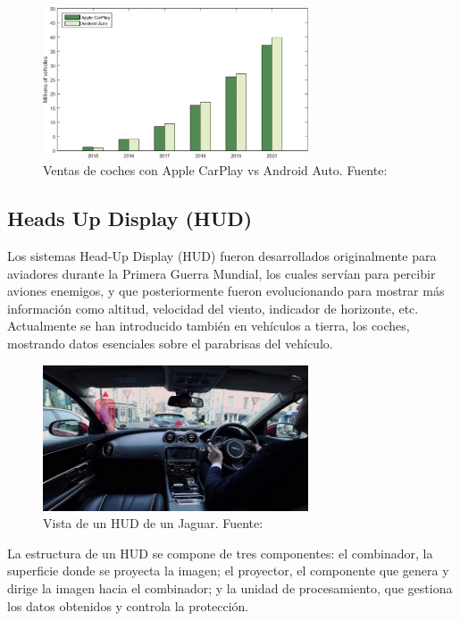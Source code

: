 \documentclass[12pt]{report} %
\begin{document}
\begin{figure}[H]
    \centering
    \includegraphics[width=0.7\textwidth]{integrationSolution.png}
	\caption{Ventas de coches con Apple CarPlay vs Android Auto. Fuente: \cite{mobileIntegration}}
	\label{fig:imagen6}
\end{figure}

\subsection{Heads Up Display (HUD)}

Los sistemas Head-Up Display (HUD) fueron desarrollados originalmente para aviadores durante la Primera Guerra Mundial, los cuales servían para percibir aviones enemigos, y que posteriormente fueron evolucionando para mostrar más información como altitud, velocidad del viento, indicador de horizonte, etc. Actualmente se han introducido también en vehículos a tierra, los coches, mostrando datos esenciales sobre el parabrisas del vehículo.
\cite{hudPaper}

\begin{figure}[h]
    \centering
    \includegraphics[width=0.7\textwidth]{hud.png}
    \caption{Vista de un HUD de un Jaguar. Fuente: \cite{hudPaper}}
    \label{fig:imagen7}
\end{figure}

La estructura de un HUD se compone de tres componentes: el combinador, la superficie donde se proyecta la imagen; el proyector, el componente que genera y dirige la imagen hacia el combinador; y la unidad de procesamiento, que gestiona los datos obtenidos y controla la protección.
\end{document}
